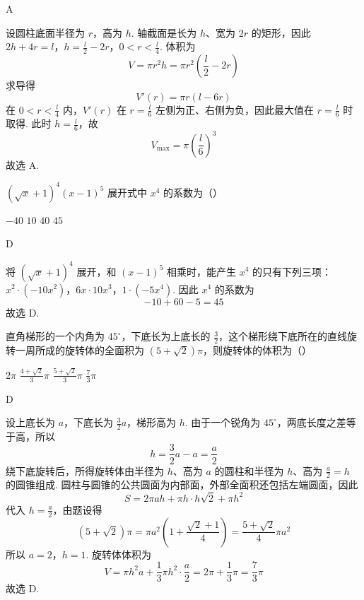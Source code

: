 \begin{answer}
A
\end{answer}

\begin{solution}
设圆柱底面半径为 \(r\)，高为 \(h\). 轴截面是长为 \(h\)、宽为 \(2r\) 的矩形，因此
\(2h+4r=l\)，\(h=\frac l2-2r\)，\(0<r<\frac l4\).
体积为
\[
V=\pi r^2h=\pi r^2\left(\frac l2-2r\right)
\]
求导得
\[
V'(r)=\pi r(l-6r)
\]
在 \(0<r<\frac l4\) 内，\(V'(r)\) 在 \(r=\frac l6\) 左侧为正、右侧为负，因此最大值在 \(r=\frac l6\) 时取得. 此时 \(h=\frac l6\)，故
\[
V_{\max}=\pi\left(\frac l6\right)^3
\]
故选 A.
\end{solution}

\begin{problem}
\((\sqrt{x}+1)^4(x-1)^5\) 展开式中 \(x^4\) 的系数为（\quad）

\choices
    {\(-40\)}
    {\(10\)}
    {\(40\)}
    {\(45\)}
\end{problem}

\begin{answer}
D
\end{answer}

\begin{solution}
将 \((\sqrt{x}+1)^4\) 展开，和 \((x-1)^5\) 相乘时，能产生 \(x^4\) 的只有下列三项：
\(x^2\cdot(-10x^2)\)，\(6x\cdot10x^3\)，\(1\cdot(-5x^4)\).
因此 \(x^4\) 的系数为
\[
-10+60-5=45
\]
故选 D.
\end{solution}

\begin{problem}
直角梯形的一个内角为 \(45^\circ\)，下底长为上底长的 \(\frac{3}{2}\)，这个梯形绕下底所在的直线旋转一周所成的旋转体的全面积为 \(\left(5+\sqrt{2}\right)\pi\)，则旋转体的体积为（\quad）

\choices
    {\(2\pi\)}
    {\(\frac{4+\sqrt{2}}{3}\pi\)}
    {\(\frac{5+\sqrt{2}}{3}\pi\)}
    {\(\frac{7}{3}\pi\)}
\end{problem}

\begin{answer}
D
\end{answer}

\begin{solution}
设上底长为 \(a\)，下底长为 \(\frac32a\)，梯形高为 \(h\). 由于一个锐角为 \(45^\circ\)，两底长度之差等于高，所以
\[
h=\frac32a-a=\frac a2
\]
绕下底旋转后，所得旋转体由半径为 \(h\)、高为 \(a\) 的圆柱和半径为 \(h\)、高为 \(\frac a2=h\) 的圆锥组成. 圆柱与圆锥的公共圆面为内部面，外部全面积还包括左端圆面，因此
\[
S=2\pi ah+\pi h\cdot h\sqrt2+\pi h^2
\]
代入 \(h=\frac a2\)，由题设得
\[
(5+\sqrt2)\pi
=\pi a^2\left(1+\frac{\sqrt2+1}{4}\right)
=\frac{5+\sqrt2}{4}\pi a^2
\]
所以 \(a=2\)，\(h=1\). 旋转体体积为
\[
V=\pi h^2a+\frac13\pi h^2\cdot\frac a2
=2\pi+\frac13\pi=\frac73\pi
\]
故选 D.
\end{solution}

